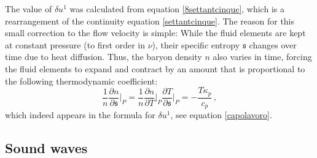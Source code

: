 \documentclass[a4paper, amsfonts, amssymb, amsmath, reprint, showkeys, nofootinbib, twoside,notitlepage,onecolumn]{revtex4-2}
\theoremstyle{definition}
\theoremstyle{theorem}
\theoremstyle{corollary}
\begin{document}
The value of $\delta u^1$ was calculated from equation \eqref{8settantcinque}, which is a rearrangement of the continuity equation \eqref{settantcinque}. The reason for this small correction to the flow velocity is simple: While the fluid elements are kept at constant pressure (to first order in $\nu$), their specific entropy $\mathfrak{s}$ changes over time due to heat diffusion. Thus, the baryon density $n$ also varies in time, forcing the fluid elements to expand and contract by an amount that is proportional to the following thermodynamic coefficient:
\begin{equation}
\dfrac{1}{n}\dfrac{\partial n}{\partial \mathfrak{s}}\bigg|_P = \dfrac{1}{n} \dfrac{\partial n}{\partial T}\bigg|_P \dfrac{\partial T}{\partial \mathfrak{s}}\bigg|_P = -\dfrac{T \kappa_p}{c_p} \, ,
\end{equation}
which indeed appears in the formula for $\delta u^1$, see equation \eqref{capolavoro}.


\subsection{Sound waves}\label{sounduzzonzone}
\end{document}
